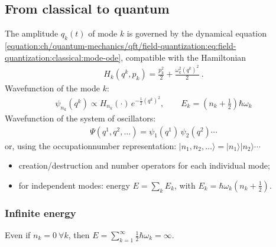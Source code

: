 \documentclass[letterpaper,10pt,english]{jupyterBook}
\begin{document}
\subsection{From classical to quantum}
\label{\detokenize{ch/quantum-mechanics/qft/field-quantization:from-classical-to-quantum}}\label{\detokenize{ch/quantum-mechanics/qft/field-quantization:quantum-mechanics-qft-field-quantization-quantization}}
\sphinxAtStartPar
The amplitude \(q_k(t)\) of mode \(k\) is governed by the dynamical equation \eqref{equation:ch/quantum-mechanics/qft/field-quantization:eq:field-quantization:classical:mode-ode}, compatible with the Hamiltonian
\begin{equation*}
\begin{split}H_k(q^k,p_k) = \frac{p_k^2}{2} + \frac{\omega_k^2 (q^k)^2}{2} \ .\end{split}
\end{equation*}
\sphinxAtStartPar
Wavefunction of the mode \(k\):
\begin{equation*}
\begin{split}
\psi_{n_k}(q^k)\propto H_{n_k}(\cdot)\,e^{-\frac12 (q^k)^2},\qquad E_k=\left(n_k+\tfrac12\right)\hbar\omega_k
\end{split}
\end{equation*}
\sphinxAtStartPar
Wavefunction of the system of oscillators:
\begin{equation*}
\begin{split}
\Psi(q^1,q^2,\dots)=\psi_1(q^1)\,\psi_2(q^2)\cdots
\end{split}
\end{equation*}
\sphinxAtStartPar
or, using the occupation\sphinxhyphen{}number representation: \(|n_1,n_2,\dots\rangle=|n_1\rangle|n_2\rangle\cdots\)
\begin{itemize}
\item {} 
\sphinxAtStartPar
creation/destruction and number operators for each individual mode;

\item {} 
\sphinxAtStartPar
for independent modes: energy \(E=\sum_kE_k\), with \(E_k=\hbar\omega_k\left(n_k+\tfrac12\right)\).

\end{itemize}


\subsubsection{Infinite energy}
\label{\detokenize{ch/quantum-mechanics/qft/field-quantization:infinite-energy}}
\sphinxAtStartPar
Even if \(n_k=0\ \forall k\), then \(E=\sum_{k=1}^{\infty}\tfrac12\hbar\omega_k=\infty\).
\end{document}
